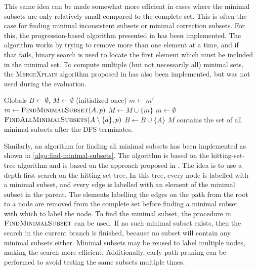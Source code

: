 This same idea can be made somewhat more efficient in cases where the minimal subsets are only relatively small compared to the complete set. This is often the case for finding minimal inconsistent subsets or minimal correction subsets. For this, the progression-based algorithm presented in \cite{marques2013minimal} has been implemented. The algorithm works by trying to remove more than one element at a time, and if that fails, binary search is used to locate the first element which must be included in the minimal set.
To compute multiple (but not necessarily all) minimal sets, the \textsc{MergeXplain} algorithm proposed in \cite{shchekotykhin2015mergexplain} has also been implemented, but was not used during the evaluation.

\begin{algorithm}[ht]
  \begin{algorithmic}
    \State Globals \enspace $B \gets \emptyset$, \enspace $M \gets \emptyset$ \quad (initialized once)
        \State $m \gets m'$
        \State $m \gets \textsc{FindMinimalSubset}(A, p)$
        \State $M \gets M \cup \{ m \}$
      \Else
        \State $m \gets \emptyset$
      \EndIf
        \State $\textsc{FindAllMinimalSubsets}(A \setminus \{ a \}, p)$
      \EndFor
      \State $B \gets B \cup \{ A \}$
    \EndIf
    \State $M$ contains the set of all minimal subsets after the DFS terminates.
  \end{algorithmic}
  \caption{$\textsc{FindAllMinimalSubsets}(A, p)$}
  \label{algo:find-minimal-subsets}
\end{algorithm}

Similarly, an algorithm for finding all minimal subsets has been implemented as shown in \cref{algo:find-minimal-subsets}. The algorithm is based on the hitting-set-tree algorithm \cite{reiter1987theory} and is based on the approach proposed in \cite{kalyanpur2007finding}. The idea is to use a depth-first search on the hitting-set-tree. In this tree, every node is labelled with a minimal subset, and every edge is labelled with an element of the minimal subset in the parent. The elements labelling the edges on the path from the root to a node are removed from the complete set before finding a minimal subset with which to label the node. To find the minimal subset, the procedure in $\textsc{FindMinimalSubset}$ can be used. If no such minimal subset exists, then the search in the current branch is finished, because no subset will contain any minimal subsets either. Minimal subsets may be reused to label multiple nodes, making the search more efficient. Additionally, early path pruning can be performed to avoid testing the same subsets multiple times.

